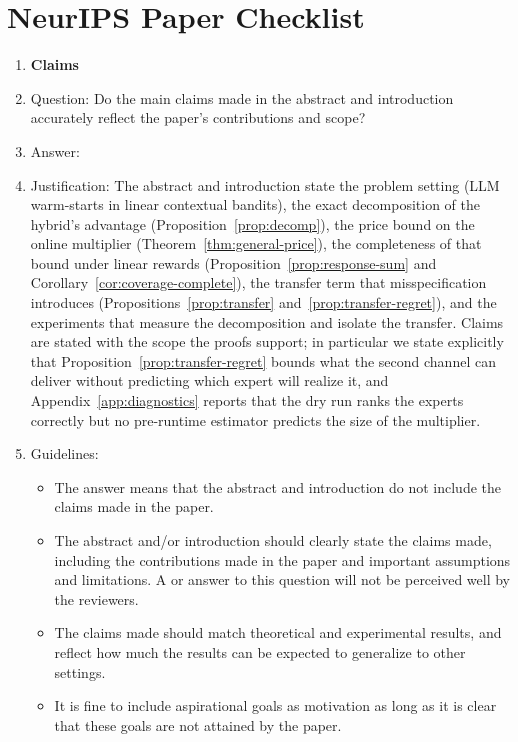 \documentclass{article}
\theoremstyle{definition}
\theoremstyle{remark}
\theoremstyle{remark}
\begin{document}
\section*{NeurIPS Paper Checklist}


\begin{enumerate}

\item {\bf Claims}
    \item[] Question: Do the main claims made in the abstract and introduction accurately reflect the paper's contributions and scope?
    \item[] Answer: \answerYes{} %
    \item[] Justification: The abstract and introduction state the problem setting (LLM warm-starts in linear contextual bandits), the exact decomposition of the hybrid's advantage (Proposition~\ref{prop:decomp}), the price bound on the online multiplier (Theorem~\ref{thm:general-price}), the completeness of that bound under linear rewards (Proposition~\ref{prop:response-sum} and Corollary~\ref{cor:coverage-complete}), the transfer term that misspecification introduces (Propositions~\ref{prop:transfer} and~\ref{prop:transfer-regret}), and the experiments that measure the decomposition and isolate the transfer. Claims are stated with the scope the proofs support; in particular we state explicitly that Proposition~\ref{prop:transfer-regret} bounds what the second channel can deliver without predicting which expert will realize it, and Appendix~\ref{app:diagnostics} reports that the dry run ranks the experts correctly but no pre-runtime estimator predicts the size of the multiplier.
    \item[] Guidelines:
    \begin{itemize}
        \item The answer \answerNA{} means that the abstract and introduction do not include the claims made in the paper.
        \item The abstract and/or introduction should clearly state the claims made, including the contributions made in the paper and important assumptions and limitations. A \answerNo{} or \answerNA{} answer to this question will not be perceived well by the reviewers. 
        \item The claims made should match theoretical and experimental results, and reflect how much the results can be expected to generalize to other settings. 
        \item It is fine to include aspirational goals as motivation as long as it is clear that these goals are not attained by the paper. 
    \end{itemize}


\end{enumerate}
\end{document}
